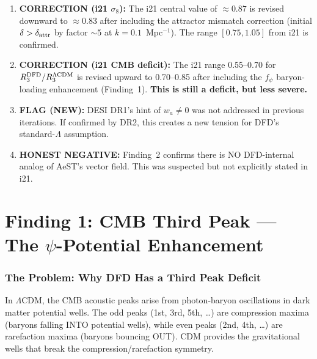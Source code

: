 \documentclass[11pt]{article}
\newcommand{\LCDM}{$\Lambda$CDM}
\begin{document}
\begin{tcolorbox}[colback=red!5!white, colframe=red!60!black,
  title=\textbf{CORRECTIONS TO PREVIOUS ITERATIONS}]
\begin{enumerate}[nosep]
\item \textbf{CORRECTION (i21 $\sigma_8$):}  The i21 central value of
  $\approx 0.87$ is revised downward to $\approx 0.83$ after including the
  attractor mismatch correction (initial $\delta > \delta_{\rm attr}$ by
  factor $\sim 5$ at $k = 0.1$~Mpc$^{-1}$).  The range $[0.75, 1.05]$
  from i21 is confirmed.

\item \textbf{CORRECTION (i21 CMB deficit):}  The i21 range 0.55--0.70
  for $R_3^{\rm DFD}/R_3^{\Lambda\rm CDM}$ is revised upward to
  0.70--0.85 after including the $f_\psi$ baryon-loading enhancement
  (Finding~1).  \textbf{This is still a deficit, but less severe.}

\item \textbf{FLAG (NEW):}  DESI DR1's hint of $w_a \neq 0$ was not
  addressed in previous iterations.  If confirmed by DR2, this creates a
  new tension for DFD's standard-$\Lambda$ assumption.

\item \textbf{HONEST NEGATIVE:}  Finding~2 confirms there is NO
  DFD-internal analog of AeST's vector field.  This was suspected but
  not explicitly stated in i21.
\end{enumerate}
\end{tcolorbox}


\part{Finding 1: CMB Third Peak --- The $\psi$-Potential Enhancement}
\label{part:CMB}

\section{The Problem: Why DFD Has a Third Peak Deficit}

In \LCDM, the CMB acoustic peaks arise from photon-baryon oscillations
in dark matter potential wells.  The odd peaks (1st, 3rd, 5th, \ldots)
are compression maxima (baryons falling INTO potential wells),
while even peaks (2nd, 4th, \ldots) are rarefaction maxima
(baryons bouncing OUT).  CDM provides the gravitational wells that break
the compression/rarefaction symmetry.
\end{document}
